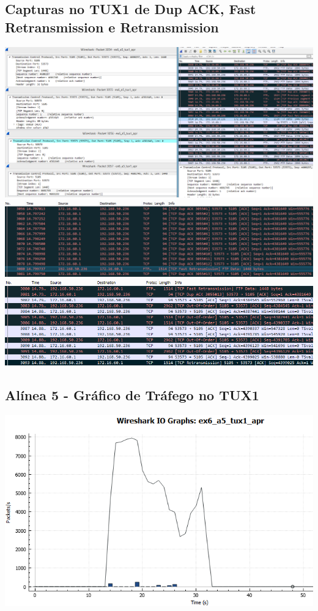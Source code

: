 \documentclass[11pt,a4paper,reqno]{report}
\numberwithin{equation}{section}
\begin{document}
\begin{appendices}
\subsection{Capturas no TUX1 de Dup ACK, Fast Retransmission e Retransmission}
\label{ex6_retrans}
\includegraphics[width=18cm]{ex6_tux1_3054.png}
\includegraphics[width=18cm]{ex6_tux1_fastretransmission.png}
\includegraphics[width=18cm]{ex6_tux1_retransmission.png}

\subsection{Alínea 5 - Gráfico de Tráfego no TUX1}
\label{ex6_a5_1io}
\includegraphics[width=18cm]{ex6_a5_tux1_IO.png}

\end{appendices}
\end{document}
